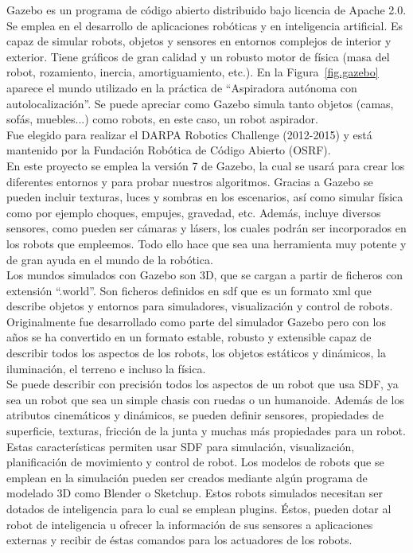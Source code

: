  
Gazebo es un programa de código abierto distribuido bajo licencia de Apache 2.0. Se emplea en el desarrollo de aplicaciones robóticas y en inteligencia artificial. Es capaz de simular robots, objetos y sensores en entornos complejos de interior y exterior. Tiene gráficos de gran calidad y un robusto motor de física (masa del robot, rozamiento, inercia, amortiguamiento, etc.). En la Figura~\ref{fig.gazebo} aparece el mundo utilizado en la práctica de ``Aspiradora autónoma con autolocalización''. Se puede apreciar como Gazebo simula tanto objetos (camas, sofás, muebles...) como robots, en este caso, un robot aspirador. \\

Fue elegido para realizar el DARPA Robotics Challenge (2012-2015) y está mantenido por la Fundación Robótica de Código Abierto (OSRF). \\

En este proyecto se emplea la versión 7 de Gazebo, la cual se usará para crear los diferentes entornos y para probar nuestros algoritmos.  Gracias a Gazebo se pueden incluir texturas, luces y sombras en los escenarios, así como simular física como por ejemplo choques, empujes, gravedad, etc. Además, incluye diversos sensores, como pueden ser cámaras y lásers, los cuales podrán ser incorporados en los robots que empleemos. Todo ello hace que sea una herramienta muy potente y de gran ayuda en el mundo de la robótica.\\

Los mundos simulados con Gazebo son 3D, que se cargan a partir de ficheros con extensión ``.world''. Son ficheros definidos en \acrfull{sdf} que es un formato \acrfull{xml} que describe objetos y entornos para simuladores, visualización y control de robots. Originalmente fue desarrollado como parte del simulador Gazebo pero con los años se ha convertido en un formato estable, robusto y extensible capaz de describir todos los aspectos de los robots, los objetos estáticos y dinámicos, la iluminación, el terreno e incluso la física.\\

Se puede describir con precisión todos los aspectos de un robot que usa SDF, ya sea un robot que sea un simple chasis con ruedas o un humanoide. Además de los atributos cinemáticos y dinámicos, se pueden definir sensores, propiedades de superficie, texturas, fricción de la junta y muchas más propiedades para un robot. Estas características permiten usar SDF para simulación, visualización, planificación de movimiento y control de robot. Los modelos de robots que se emplean en la simulación pueden ser creados mediante algún programa de modelado 3D como Blender o Sketchup. Estos robots simulados necesitan ser dotados de inteligencia para lo cual se emplean plugins. Éstos, pueden dotar al robot de inteligencia u ofrecer la información de sus sensores a aplicaciones externas y recibir de éstas comandos para los actuadores de los robots.


